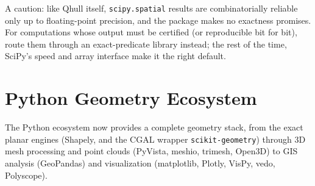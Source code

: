 A caution: like Qhull itself, \texttt{scipy.spatial} results are
combinatorially reliable only up to floating-point precision, and the
package makes no exactness promises. For computations whose output must
be certified (or reproducible bit for bit), route them through an
exact-predicate library instead; the rest of the time, SciPy's speed and
array interface make it the right default.

\section{Python Geometry Ecosystem}
\label{sec:app_soft_python}

The Python ecosystem now provides a complete geometry stack, from the
exact planar engines (Shapely, and the CGAL wrapper
\texttt{scikit-geometry}) through 3D mesh processing and point clouds
(PyVista, meshio, trimesh, Open3D) to GIS analysis (GeoPandas) and
visualization (matplotlib, Plotly, VisPy, vedo, Polyscope).


